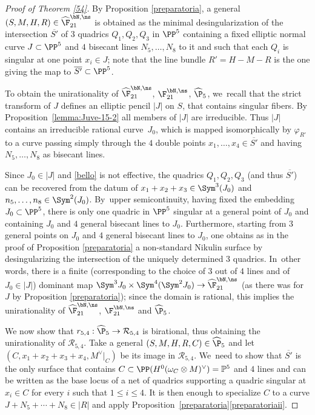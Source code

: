 \begin{proof}[Proof of Theorem \ref{54}]
By Proposition \ref{preparatoria}, a general $(S,M,H,R)\in
\widehat{\F}_{21}^{\bN,\ns}$ is obtained as the minimal desingularization of the intersection $\overline{S'}$ of $3$ quadrics $Q_1,Q_2,Q_3$ in $\PP^5$ containing a fixed elliptic normal curve $J\subset \PP^5$ and $4$ bisecant lines $N_5,\ldots, N_8$ to it and such that each $Q_i$ is singular at one point $x_i\in J$; note that the line bundle $R'=H-M-R$ is the one giving the map to $\overline{S'}\subset\PP^5$.

To obtain the unirationality of $\widehat{\F}_{21}^{\bN,\ns}$, $\F_{21}^{\bN,\ns}$, $\widehat\P_{5}$, we~recall that the strict transform of $J$ defines an elliptic pencil $|J|$ on $S$, that contains singular fibers. By Proposition~\ref{lemma:Juve-15-2} all members of $|J|$ are irreducible. Thus $|J|$ contains an irreducible rational curve~$J_0$, which is mapped isomorphically by $\varphi_{R'}$ to a curve passing simply through the $4$ double points $x_1,\ldots,x_4\in\overline{S'}$ and having $N_5,\ldots, N_8$ as bisecant lines.

Since $J_0\in |J|$ and \eqref{bello} is not effective, the quadrics $Q_1,Q_2,Q_3$ (and thus $\overline{S'}$) can be recovered from the datum of $x_1+x_2+x_3\in \Sym^3(J_0)$ and $n_5,\ldots, n_8\in\Sym^2(J_0)$. By~upper semicontinuity, having fixed the embedding $J_0\subset \PP^5$, there is only one quadric in $\PP^5$ singular at a general point of $J_0$ and containing $J_0$ and $4$ general bisecant lines to $J_0$. Furthermore, starting from $3$ general points on $J_0$ and $4$ general bisecant lines to $J_0$, one obtains as in the proof of Proposition \ref{preparatoria} a
non-standard Nikulin surface by desingularizing the intersection of the uniquely determined $3$ quadrics. In~other words, there is a finite (corresponding to the choice of $3$ out of $4$ lines and of $J_0\in |J|$) dominant map $\Sym^3{J_0}\times \Sym^4(\Sym^2J_0)\to \widehat{\F}_{21}^{\bN,\ns}$ (as there was for $J$ by Proposition \ref{preparatoria}); since the domain is rational, this implies the unirationality of $\widehat{\F}_{21}^{\bN,\ns}$, $\F_{21}^{\bN,\ns}$ and $\widehat\P_{5}$.

We now show that $r_{5,4}:\widehat\P_{5}\to \mathcal R_{5,4}$ is birational, thus obtaining the unirationality of $\mathcal R_{5,4}$. Take a general $(S,M,H,R,C)\in \widehat\P_{5}$ and let $(C,x_1+x_2+x_3+x_4,M^\vee|_C)$ be its image in $\mathcal R_{5,4}$. We~need to show that $\overline{S'}$ is the only surface that contains $C\subset \PP(H^0(\omega_C\otimes M)^\vee)=\mathbb P^5$ and $4$ lines and can be written as the base locus of a net of quadrics supporting a quadric singular at $x_i\in C$ for every $i$ such that $1\leq i\leq 4$. It is then enough to specialize $C$ to a curve $J+N_5+\cdots+N_8\in |R|$ and apply Proposition~\ref{preparatoria}\eqref{preparatoriaii}.
\end{proof}

